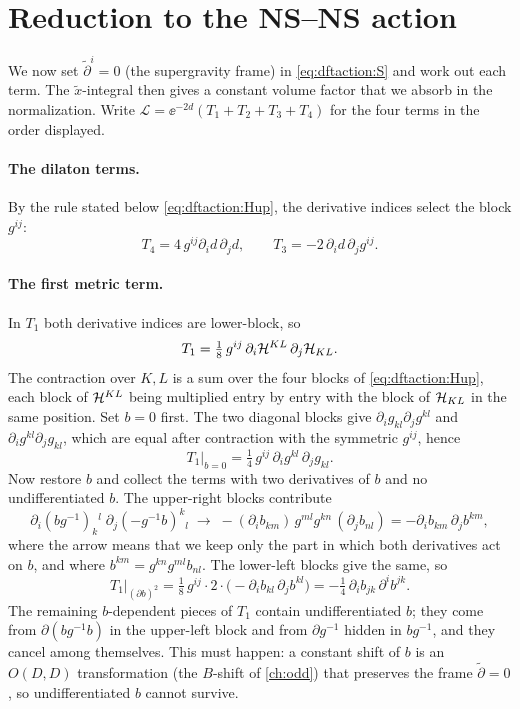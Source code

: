 \section{Reduction to the NS--NS action}\label{sec:dftaction:reduction}

We now set $\tilde\partial^i=0$ (the supergravity frame) in
\eqref{eq:dftaction:S} and work out each term. The
$\tilde x$-integral then gives a constant volume factor that we absorb in the normalization.
Write $\mathcal L=\ee^{-2d}(T_1+T_2+T_3+T_4)$ for the four terms in the order displayed.

\paragraph{The dilaton terms.} By the rule stated below \eqref{eq:dftaction:Hup}, the
derivative indices select the block $g^{ij}$:
\begin{equation}\label{eq:dftaction:T34}
T_4=4\,g^{ij}\partial_id\,\partial_jd,\qquad T_3=-2\,\partial_id\,\partial_jg^{ij}.
\end{equation}

\paragraph{The first metric term.} In $T_1$ both derivative indices are lower-block, so
\[
T_1=\tfrac18\,g^{ij}\,\partial_i\mathcal{H}^{KL}\,\partial_j\mathcal{H}_{KL}.
\]
The contraction over $K,L$ is a sum
over the four blocks of \eqref{eq:dftaction:Hup}, each block of $\mathcal{H}^{KL}$ being multiplied
entry by entry with the block of $\mathcal{H}_{KL}$ in the same position. Set $b=0$ first. The two
diagonal blocks give $\partial_ig_{kl}\partial_jg^{kl}$ and $\partial_ig^{kl}\partial_jg_{kl}$,
which are equal after contraction with the symmetric $g^{ij}$, hence
\begin{equation}\label{eq:dftaction:T1g}
T_1\big|_{b=0}=\tfrac14\,g^{ij}\,\partial_ig^{kl}\,\partial_jg_{kl}.
\end{equation}
Now restore $b$ and collect the terms with two derivatives of $b$ and no undifferentiated
$b$. The upper-right blocks contribute
\[
\partial_i(bg^{-1})_k{}^{l}\;\partial_j(-g^{-1}b)^k{}_l\;\longrightarrow\;-(\partial_ib_{km})\,g^{ml}
g^{kn}\,(\partial_jb_{nl})=-\partial_ib_{km}\,\partial_jb^{km},
\]
where the arrow means that we keep only the part in which both derivatives act on $b$, and
where $b^{km}=g^{kn}g^{ml}b_{nl}$. The lower-left blocks give the same, so
\begin{equation}\label{eq:dftaction:T1b}
T_1\big|_{(\partial b)^2}=\tfrac18\,g^{ij}\cdot2\cdot\bigl(-\partial_ib_{kl}\,\partial_jb^{kl}
\bigr)=-\tfrac14\,\partial_ib_{jk}\,\partial^ib^{jk}.
\end{equation}
The remaining $b$-dependent pieces of $T_1$ contain undifferentiated $b$; they come from
$\partial(bg^{-1}b)$ in the upper-left block and from $\partial g^{-1}$ hidden in $bg^{-1}$, and
they cancel among themselves. This must happen: a constant shift of $b$ is an $O(D,D)$
transformation (the $B$-shift of \cref{ch:odd}) that preserves the frame $\tilde\partial=0$, so
undifferentiated $b$ cannot survive.

